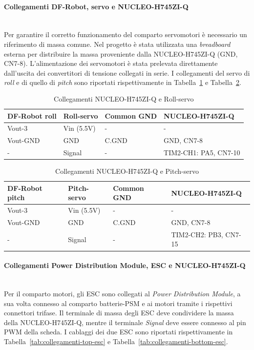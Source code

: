 \documentclass[11pt]{report}
\begin{document}
	\paragraph{Collegamenti DF-Robot, servo e NUCLEO-H745ZI-Q}\mbox{}\\
	Per garantire il corretto funzionamento del comparto servomotori è necessario un riferimento di massa comune. Nel progetto è stata utilizzata una \textit{breadboard} esterna per distribuire la massa proveniente dalla NUCLEO-H745ZI-Q (GND, CN7-8). L'alimentazione dei servomotori è stata prelevata direttamente dall'uscita dei convertitori di tensione collegati in serie. I collegamenti del servo di \textit{roll} e di quello di \textit{pitch} sono riportati rispettivamente in Tabella~\ref{tab:collegamenti-roll-servo} e Tabella~\ref{tab:collegamenti-pitch-servo}.

	\begin{table}[H]
		\centering
		\begin{tabular}{l l l l}
			\toprule
			\textbf{DF-Robot roll} & \textbf{Roll-servo} & \textbf{Common GND} & \textbf{NUCLEO-H745ZI-Q} \\
			\midrule
			Vout-3 & Vin (5.5V) & - & - \\
			Vout-GND & GND & C.GND & GND, CN7-8 \\
			- & Signal & - & TIM2-CH1: PA5, CN7-10 \\
			\bottomrule
		\end{tabular}
		\caption{Collegamenti NUCLEO-H745ZI-Q e Roll-servo}
		\label{tab:collegamenti-roll-servo}
	\end{table}

	\begin{table}[H]
		\centering
		\begin{tabular}{l l l l}
			\toprule
			\textbf{DF-Robot pitch} & \textbf{Pitch-servo} & \textbf{Common GND} & \textbf{NUCLEO-H745ZI-Q} \\
			\midrule
			Vout-3 & Vin (5.5V) & - & - \\
			Vout-GND & GND & C.GND & GND, CN7-8 \\
			- & Signal & - & TIM2-CH2: PB3, CN7-15 \\
			\bottomrule
		\end{tabular}
		\caption{Collegamenti NUCLEO-H745ZI-Q e Pitch-servo}
		\label{tab:collegamenti-pitch-servo}
	\end{table}

	\paragraph{Collegamenti Power Distribution Module, ESC e NUCLEO-H745ZI-Q}\mbox{}\\
	Per il comparto motori, gli ESC sono collegati al \textit{Power Distribution Module}, a sua volta connesso al comparto batterie-PSM e ai motori tramite i rispettivi connettori trifase. Il terminale di massa degli ESC deve condividere la massa della NUCLEO-H745ZI-Q, mentre il terminale \textit{Signal} deve essere connesso al pin PWM della scheda. I cablaggi dei due ESC sono riportati rispettivamente in Tabella~\ref{tab:collegamenti-top-esc} e Tabella~\ref{tab:collegamenti-bottom-esc}.
\end{document}
